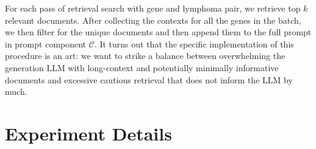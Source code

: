 For each pass of retrieval search with gene and lymphoma pair, we retrieve top $k$ relevant documents. After collecting the contexts for all the genes in the batch, we then filter for the unique documents and then append them to the full prompt in prompt component $\mathcal{C}$. It turns out that the specific implementation of this procedure is an art: we want to strike a balance between overwhelming the generation LLM with long-context and potentially minimally informative documents and excessive cautious retrieval that does not inform the LLM by much. 

\section{Experiment Details}\label{appdx:exp}




